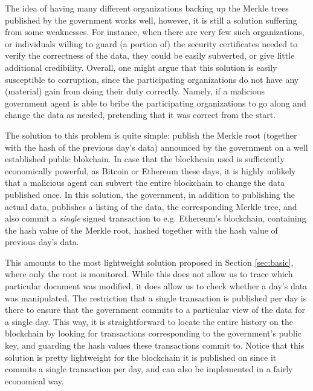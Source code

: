 

The idea of having many different organizations backing up the Merkle trees published by the government works well, however, it is still a solution suffering from some weaknesses. For instance, when there are very few such organizations, or individuals willing to guard (a portion of) the security certificates needed to verify the correctness of the data, they could be easily subverted, or give little additional credibility. Overall, one might argue that this solution is easily susceptible to corruption, since the participating organizations do not have any (material) gain from doing their duty correctly. Namely, if a malicious government agent is able to bribe the participating organizations to go along and change the data as needed, pretending that it was correct from the start. %


The solution to this problem is quite simple: publish the Merkle root (together with the hash of the previous day's data) announced by the government on a well established public blokchain. In case that the blockhcain used is sufficiently economically powerful, as Bitcoin or Ethereum these days, it is highly unlikely that a malicious agent can subvert the entire blockchain to change the data published once. In this solution, the government, in addition to publishing the actual data, publishes a listing of the data, the corresponding Merkle tree, and also commit a {\em single} signed transaction to e.g. Ethereum's blockchain, containing the hash value of the Merkle root, hashed together with the hash value of previous day's data.

This amounts to the most lightweight solution proposed in Section \ref{sec:basic}, where only the root is monitored. While this does not allow us to trace which particular document was modified, it does allow us to check whether a day's data was manipulated. The restriction that a single transaction is published per day is there to ensure that  the government commits to a particular view of the data for a single day. This way, it is straightforward to locate the entire history on the blockchain by looking for transactions corresponding to the government's public key, and guarding the hash values these transactions commit to. Notice that this solution is pretty lightweight for the blockchain it is published on since it commits a single transaction per day, and can also be implemented in a fairly economical way.



